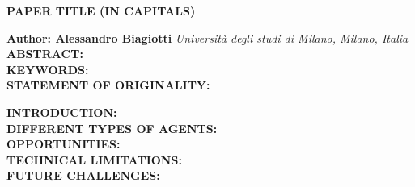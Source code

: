 \documentclass[a4paper,10pt]{article}
\begin{document}
\noindent 
\begin{center}
\textbf{{\Large PAPER TITLE (IN CAPITALS)}} \\
\end{center}

\noindent 
\textbf{Author: Alessandro Biagiotti} \textit{Università degli studi di Milano, Milano, Italia}
\\


\noindent 
\textbf{ABSTRACT:}
\\

\noindent 
\textbf{KEYWORDS:} 
\\

\noindent 
\textbf{STATEMENT OF ORIGINALITY:} 

\clearpage

\noindent
\textbf{INTRODUCTION:}
\label{sec:introduction}
\\



\noindent
\textbf{DIFFERENT TYPES OF AGENTS:}
\makeatletter\def\@currentlabel{\texttt{(I)}}\makeatother
\label{sec:ai-agents}
\\


\noindent
\textbf{OPPORTUNITIES:}
\makeatletter\def\@currentlabel{\texttt{(II)}}\makeatother
\label{sec:opportunities}
\\


\noindent
\textbf{TECHNICAL LIMITATIONS:}
\makeatletter\def\@currentlabel{\texttt{(III)}}\makeatother
\label{sec:technical-limitations}
\\


\noindent
\textbf{FUTURE CHALLENGES:}
\makeatletter\def\@currentlabel{\texttt{(IV)}}\makeatother
\label{sec:future-challenges}
\\

\clearpage
\printbibliography
\end{document}
